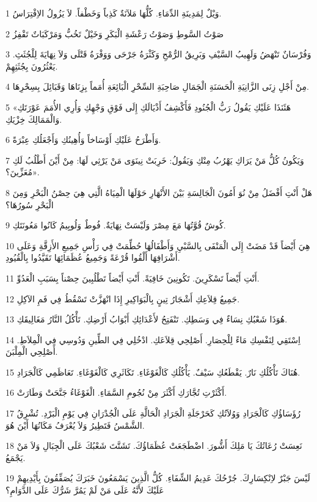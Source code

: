 \par 1 وَيْلٌ لِمَدِينَةِ الدِّمَاءِ. كُلُّهَا مَلآنَةٌ كَذِباً وَخَطْفاً. لاَ يَزُولُ الاِفْتِرَاسُ.
\par 2 صَوْتُ السَّوطِ وَصَوْتُ رَعْشَةِ الْبَكَرِ وَخَيْلٌ تَخُبُّ وَمَرْكَبَاتٌ تَقْفِزُ
\par 3 وَفُرْسَانٌ تَنْهَضُ وَلَهِيبُ السَّيْفِ وَبَرِيقُ الرُّمْحِ وَكَثْرَةُ جَرْحَى وَوَفْرَةُ قَتْلَى وَلاَ نِهَايَةَ لِلْجُثَثِ. يَعْثُرُونَ بِجُثَثِهِمْ.
\par 4 مِنْ أَجْلِ زِنَى الزَّانِيَةِ الْحَسَنَةِ الْجَمَالِ صَاحِبَةِ السِّحْرِ الْبَائِعَةِ أُمَماً بِزِنَاهَا وَقَبَائِلَ بِسِحْرِهَا.
\par 5 «هَئَنَذَا عَلَيْكِ يَقُولُ رَبُّ الْجُنُودِ فَأَكْشِفُ أَذْيَالَكِ إِلَى فَوْقِ وَجْهِكِ وَأُرِي الأُمَمَ عَوْرَتَكِ وَالْمَمَالِكَ خِزْيَكِ.
\par 6 وَأَطْرَحُ عَلَيْكِ أَوْسَاخاً وَأُهِينُكِ وَأَجْعَلُكِ عِبْرَةً.
\par 7 وَيَكُونُ كُلُّ مَنْ يَرَاكِ يَهْرُبُ مِنْكِ وَيَقُولُ: خَرِبَتْ نِينَوَى مَنْ يَرْثِي لَهَا: مِنْ أَيْنَ أَطْلُبُ لَكِ مُعَزِّينَ؟».
\par 8 هَلْ أَنْتِ أَفْضَلُ مِنْ نُوَ أَمُونَ الْجَالِسَةِ بَيْنَ الأَنْهَارِ حَوْلَهَا الْمِيَاهُ الَّتِي هِيَ حِصْنُ الْبَحْرِ وَمِنَ الْبَحْرِ سُورُهَا؟
\par 9 كُوشٌ قُوَّتُهَا مَعَ مِصْرَ وَلَيْسَتْ نِهَايَةٌ. فُوطٌ وَلُوبِيمُ كَانُوا مَعُونَتَكِ.
\par 10 هِيَ أَيْضاً قَدْ مَضَتْ إِلَى الْمَنْفَى بِالسَّبْيِ وَأَطْفَالُهَا حُطِّمَتْ فِي رَأْسِ جَمِيعِ الأَزِقَّةِ وَعَلَى أَشْرَافِهَا أَلْقُوا قُرْعَةً وَجَمِيعُ عُظَمَائِهَا تَقَيَّدُوا بِالْقُيُودِ.
\par 11 أَنْتِ أَيْضاً تَسْكَرِينَ. تَكُونِينَ خَافِيَةً. أَنْتِ أَيْضاً تَطْلُبِينَ حِصْناً بِسَبَبِ الْعَدُوِّ.
\par 12 جَمِيعُ قِلاَعِكِ أَشْجَارُ تِينٍ بِالْبَوَاكِيرِ إِذَا انْهَزَّتْ تَسْقُطُ فِي فَمِ الآكِلِ.
\par 13 هُوَذَا شَعْبُكِ نِسَاءٌ فِي وَسَطِكِ. تَنْفَتِحُ لأَعْدَائِكِ أَبْوَابُ أَرْضِكِ. تَأْكُلُ النَّارُ مَغَالِيقَكِ.
\par 14 اِسْتَقِي لِنَفْسِكِ مَاءً لِلْحِصَارِ. أَصْلِحِي قِلاَعَكِ. ادْخُلِي فِي الطِّينِ وَدُوسِي فِي الْمِلاَطِ. أَصْلِحِي الْمِلْبَنَ.
\par 15 هُنَاكَ تَأْكُلُكِ نَارٌ. يَقْطَعُكِ سَيْفٌ. يَأْكُلُكِ كَالْغَوْغَاءِ. تَكَاثَرِي كَالْغَوْغَاءِ. تَعَاظَمِي كَالْجَرَادِ.
\par 16 أَكْثَرْتِ تُجَّارَكِ أَكْثَرَ مِنْ نُجُومِ السَّمَاءِ. الْغَوْغَاءُ جَنَّحَتْ وَطَارَتْ.
\par 17 رُؤَسَاؤُكِ كَالْجَرَادِ وَوُلاَتُكِ كَحَرْجَلَةِ الْجَرَادِ الْحَالَّةِ عَلَى الْجُدْرَانِ فِي يَوْمِ الْبَرْدِ. تُشْرِقُ الشَّمْسُ فَتَطِيرُ وَلاَ يُعْرَفُ مَكَانُهَا أَيْنَ هُوَ.
\par 18 نَعِسَتْ رُعَاتُكَ يَا مَلِكَ أَشُّورَ. اضْطَجَعَتْ عُظَمَاؤُكَ. تَشَتَّتَ شَعْبُكَ عَلَى الْجِبَالِ وَلاَ مَنْ يَجْمَعُ.
\par 19 لَيْسَ جَبْرٌ لاِنْكِسَارِكَ. جُرْحُكَ عَدِيمُ الشِّفَاءِ. كُلُّ الَّذِينَ يَسْمَعُونَ خَبَرَكَ يُصَفِّقُونَ بِأَيْدِيهِمْ عَلَيْكَ لأَنَّهُ عَلَى مَنْ لَمْ يَمُرَّ شَرُّكَ عَلَى الدَّوَامِ؟


